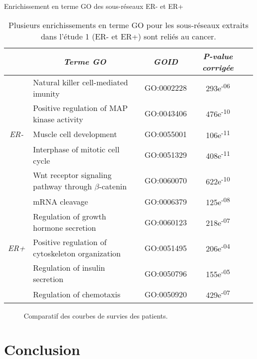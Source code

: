     \begin{table}
        \begin{center}
          \caption{Enrichissement en terme GO des sous-réseaux ER- et ER+}
          \begin{tabular}{clccr}
            \toprule
            & \multicolumn{1}{c}{\emph{Terme GO}} & \emph{GOID} & \emph{P-value corrigée} \\
            \midrule
            \multirow{5}{*}{\emph{ER-}} & Natural killer cell-mediated imunity                      & GO:0002228  & 293e\textsuperscript{-06} \\
                                        & Positive regulation of MAP kinase activity                & GO:0043406  & 476e\textsuperscript{-10} \\
                                        & Muscle cell development                                   & GO:0055001  & 106e\textsuperscript{-11} \\
                                        & Interphase of mitotic cell cycle                          & GO:0051329  & 408e\textsuperscript{-11} \\
                                        & Wnt receptor signaling pathway through ${\beta}$-catenin  & GO:0060070  & 622e\textsuperscript{-10} \\
            \midrule
            \multirow{5}{*}{\emph{ER+}} & mRNA cleavage                                             & GO:0006379  & 125e\textsuperscript{-08} \\
                                        & Regulation of growth hormone secretion                    & GO:0060123  & 218e\textsuperscript{-07} \\
                                        & Positive regulation of cytoskeleton organization          & GO:0051495  & 206e\textsuperscript{-04} \\
                                        & Regulation of insulin secretion                           & GO:0050796  & 155e\textsuperscript{-05} \\
                                        & Regulation of chemotaxis                                  & GO:0050920  & 429e\textsuperscript{-07} \\
            \bottomrule
          \end{tabular}
          \label{tab:Res2GO}
          \vspace{5ex}
          \caption*{Plusieurs enrichissements en terme GO pour les sous-réseaux extraits dans l'étude 1 (ER- et ER+) sont reliés au cancer.}
        \end{center}
      \end{table}

      \begin{figure}
        \begin{center}
          \def\svgwidth{\columnwidth}
          \caption{Comparatif des courbes de survies des patients.}
          \label{fig:Survival}
        \end{center}
      \end{figure}


  \section{\textcolor{mygreen}{Conclusion}}